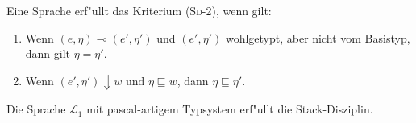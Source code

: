 \documentclass[12pt,fleqn,a4paper]{article}
\newcommand{\RN}[1]{\mbox{\textsc{(#1)}}}
\begin{document}
\begin{lemma}
  Eine Sprache erf"ullt das Kriterium \RN{Sd-2}, wenn gilt:
  \begin{enumerate}
  \item Wenn $(e,\eta) \multimap (e',\eta')$ und $(e',\eta')$ wohlgetypt, aber nicht vom Basistyp, dann gilt
    $\eta = \eta'$.
  \item Wenn $(e',\eta') \Downarrow w$ und $\eta \sqsubseteq w$, dann $\eta \sqsubseteq \eta'$.
  \end{enumerate}
\end{lemma}

\begin{theorem}
  Die Sprache $\mathcal{L}_1$ mit pascal-artigem Typsystem erf"ullt die Stack-Disziplin.
\end{theorem}
\end{document}
